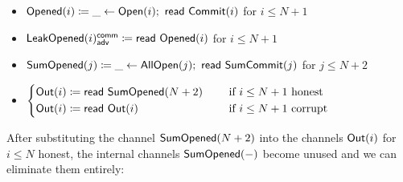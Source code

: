\begin{itemize}
\item {\color{red} $\mathsf{Opened}(i) \coloneqq \_ \leftarrow \mathsf{Open}(i); \ \mathsf{read} \ \mathsf{Commit}(i)$ for $i \leq N+1$}
\item {\color{red} $\mathsf{LeakOpened}(i)^{\mathsf{comm}}_{\mathsf{adv}} \coloneqq \mathsf{read} \ \mathsf{Opened}(i)$ for $i \leq N+1$}
\item {\color{red} $\mathsf{SumOpened}(j) \coloneqq \_ \leftarrow \mathsf{AllOpen}(j); \ \mathsf{read} \ \mathsf{SumCommit}(j)$ for $j \leq N+2$}
\item $\begin{cases*} \Out(i) \coloneqq \read{\SumOpened(N+2)} & \hspace{10pt} \text{if $i \leq N+1$ honest} \\ \Out(i) \coloneqq \read{\Out(i)} & \hspace{10pt} \text{if $i \leq N+1$ corrupt} \end{cases*}$
\end{itemize}

\noindent After substituting the channel $\mathsf{SumOpened}(N+2)$ into the channels $\mathsf{Out}(i)$ for $i \leq N$ honest, the internal channels $\mathsf{SumOpened}(-)$ become unused and we can eliminate them entirely:

